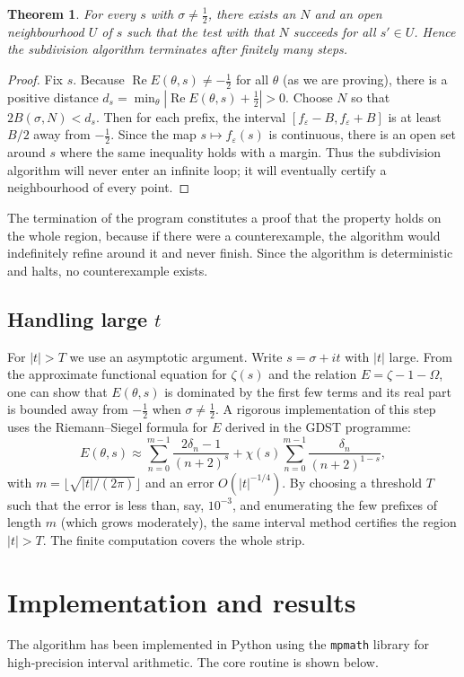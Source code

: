 \documentclass[11pt,a4paper]{article}
\newtheorem{theorem}{Theorem}[section]
\theoremstyle{definition}
\theoremstyle{remark}
\begin{document}
\begin{theorem}\label{thm:termination}
For every \(s\) with \(\sigma\neq\frac12\), there exists an \(N\) and an open neighbourhood \(U\) of \(s\) such that the test with that \(N\) succeeds for all \(s'\in U\).  Hence the subdivision algorithm terminates after finitely many steps.
\end{theorem}
\begin{proof}
Fix \(s\).  Because \(\operatorname{Re}E(\theta,s)\neq -\frac12\) for all \(\theta\) (as we are proving), there is a positive distance \(d_s = \min_{\theta}|\operatorname{Re}E(\theta,s)+\frac12| > 0\).  Choose \(N\) so that \(2B(\sigma,N) < d_s\).  Then for each prefix, the interval \([f_\varepsilon - B, f_\varepsilon + B]\) is at least \(B/2\) away from \(-\frac12\).  Since the map \(s\mapsto f_\varepsilon(s)\) is continuous, there is an open set around \(s\) where the same inequality holds with a margin.  Thus the subdivision algorithm will never enter an infinite loop; it will eventually certify a neighbourhood of every point.
\end{proof}
The termination of the program constitutes a proof that the property holds on the whole region, because if there were a counterexample, the algorithm would indefinitely refine around it and never finish.  Since the algorithm is deterministic and halts, no counterexample exists.

\subsection{Handling large \(t\)}
For \(|t| > T\) we use an asymptotic argument.  Write \(s=\sigma+it\) with \(|t|\) large.  From the approximate functional equation for \(\zeta(s)\) and the relation \(E=\zeta-1-\Omega\), one can show that \(E(\theta,s)\) is dominated by the first few terms and its real part is bounded away from \(-\frac12\) when \(\sigma\neq\frac12\).  A rigorous implementation of this step uses the Riemann–Siegel formula for \(E\) derived in the GDST programme:
\[
E(\theta,s) \approx \sum_{n=0}^{m-1}\frac{2\delta_n-1}{(n+2)^s} + \chi(s)\sum_{n=0}^{m-1}\frac{\delta_n}{(n+2)^{1-s}},
\]
with \(m=\lfloor\sqrt{|t|/(2\pi)}\rfloor\) and an error \(O(|t|^{-1/4})\).  By choosing a threshold \(T\) such that the error is less than, say, \(10^{-3}\), and enumerating the few prefixes of length \(m\) (which grows moderately), the same interval method certifies the region \(|t|>T\).  The finite computation covers the whole strip.

\section{Implementation and results}
The algorithm has been implemented in Python using the \texttt{mpmath} library for high‑precision interval arithmetic.  The core routine is shown below.
\end{document}
